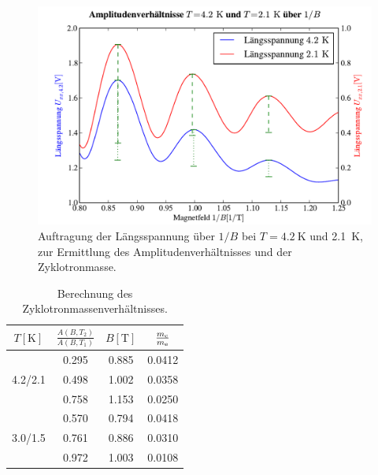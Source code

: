 \documentclass[paper=a4,fontsize=10pt,DIV=18,twocolumn,parskip=half]{scrartcl}
\numberwithin{equation}{section}    %
\begin{document}
\begin{figure}[htp]
	\begin{center}
		\includegraphics[width=\columnwidth]{Data-Plots/12-4,2-2,1-zyklotron-1-B.pdf}
		\caption{Auftragung der Längsspannung über $1/B$ bei $T=\SI{4.2}{\kelvin}$ und \SI{2.1}{\kelvin}, zur Ermittlung des Amplitudenverhältnisses und der Zyklotronmasse.}
		\label{fig:zyklotronmasse2}
	\end{center}
\end{figure}

\begin{table}[htp]
	\begin{center}
		\begin{tabular}{c|ccc}
			\hline
			$T[\mathrm{K}]$ & $\frac{A(B,T_2)}{A(B,T_1)}$ & $B[\mathrm{T}]$ & $\frac{m_{\rm c}}{m_{\rm e}}$\\
			\hline
			 		& 0.295 & 0.885 & 0.0412 \\
			4.2/2.1 & 0.498 & 1.002 & 0.0358 \\
			 		& 0.758 & 1.153 & 0.0250 \\
			\hline
					& 0.570 & 0.794 & 0.0418 \\
			3.0/1.5 & 0.761 & 0.886 & 0.0310 \\
					& 0.972 & 1.003 & 0.0108 \\
		\end{tabular}
		\caption{Berechnung des Zyklotronmassenverhältnisses.}
		\label{tab:zyklotronmasse}
	\end{center}
\end{table}
\end{document}
